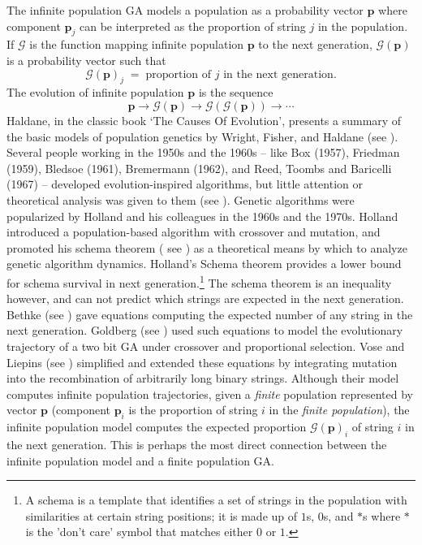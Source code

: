 The infinite population GA models a population as a probability vector $\bm{p}$ where component $\bm{p}_j$ 
can be interpreted as the proportion of string $j$ in the population. If $\mathcal{G}$ is the function mapping infinite population $\bm{p}$ to 
the next generation, $\mathcal{G}(\bm{p})$ is a probability vector such that 
\[
\mathcal{G}(\bm{p})_j \; = \; \text{proportion of $j$ in the next generation}.
\]
The evolution of infinite population $\bm{p}$ is the sequence
\[ \bm{p} \to \mathcal{G}(\bm{p}) \to  {\mathcal{G}}(\mathcal{G}(\bm{p})) \to \cdots \]
\setcounter{footnote}{2}
Haldane, in the classic book `The Causes Of Evolution', presents a summary of the basic models of population genetics 
by Wright, Fisher, and Haldane (see \cite{Haldane1932}). 
Several people working in the 1950s and the 1960s -- like Box (1957), Friedman (1959),
Bledsoe (1961), Bremermann (1962), and Reed, Toombs and Baricelli (1967) -- developed evolution-inspired algorithms, 
but little attention or theoretical analysis was given to them (see \cite{Mitchell1999}). Genetic algorithms were popularized by Holland 
and his colleagues in the 1960s and the 1970s. Holland introduced a population-based algorithm with crossover and mutation, 
and promoted his schema theorem ( see \cite{Holland1975}) as a theoretical means by which to analyze genetic algorithm dynamics. 
Holland's Schema theorem provides a lower bound for schema survival in 
next generation.\footnote{A schema is a template that identifies a set of strings in the population with similarities 
at certain string positions; it is made up of $1$s, $0$s, and $\ast$s where 
$\ast$ is the 'don't care' symbol that matches either $0$ or $1$.} The schema theorem is an inequality however, 
and can not predict which strings are expected in the next generation. 
Bethke (see \cite{Bethke1981}) gave equations computing the expected number of any string in the next generation. 
Goldberg (see \cite{Goldberg1987}) used such equations 
to model the evolutionary trajectory of a two bit GA under crossover 
and proportional selection. Vose and Liepins (see \cite{VoseLiepins1991}) simplified and extended 
these equations by integrating mutation into the recombination of arbitrarily long binary strings. 
Although their model computes infinite population trajectories, given a {\em finite} population represented by vector $\bm{p}$  
(component $\bm{p}_i$ is the proportion of string $i$ in the {\em finite population}), the infinite population model 
computes the expected proportion $\mathcal{G}(\bm{p})_i$ of string $i$ in the next generation.  This is perhaps the most 
direct connection between the infinite population model and a finite population GA.

